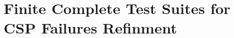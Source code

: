 \section{Finite Complete Test Suites for CSP Failures Refinment}
\label{sec:finitecompletefails}



